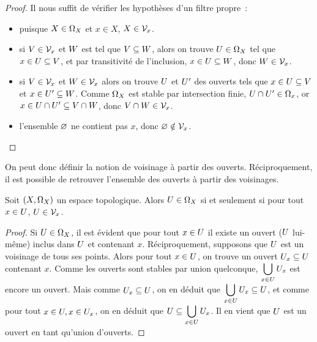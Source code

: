 \begin{proof}
  Il nous suffit de vérifier les hypothèses d'un filtre propre~:
  \begin{itemize}
  \item puisque $X\in\Omega_{X}$ et $x\in X$, $X\in \mathcal{V}_{x}$.
  \item si $V\in \mathcal{V}_{x}$ et $W$ est tel que
    $V\subseteq W$, alors on trouve
    $U\in \Omega_{X}$ tel que $x\in U \subseteq V$, et par
    transitivité de l'inclusion, $x\in U \subseteq W$, donc
    $W\in \mathcal{V}_{x}$.
  \item si $V\in \mathcal{V}_{x}$ et $W\in \mathcal{V}_{x}$ alors on trouve
    $U$ et $U'$ des
    ouverts tels que $x\in U \subseteq V$ et
    $x\in U' \subseteq W$. Comme
    $\Omega_{X}$ est stable par intersection finie,
    $U\cap U' \in\Omega_{x}$, or
    $x\in U\cap U' \subseteq V\cap W$,
    donc $V\cap W \in \mathcal{V}_{x}$.
  \item l'ensemble $\varnothing$ ne contient pas $x$, donc
    $\varnothing\notin\mathcal{V}_{x}$.\qedhere
  \end{itemize}
\end{proof}

On peut donc définir la notion de voisinage à partir des ouverts.
Réciproquement, il est possible de retrouver l'ensemble des ouverts à partir des
voisinages.

\begin{proposition}
  Soit $(X,\Omega_{X})$ un espace topologique. Alors $U\in \Omega_{X}$ si et
  seulement si pour tout $x\in U$, $U\in\mathcal{V}_{x}$.
\end{proposition}

\begin{proof}
  Si $U\in \Omega_{X}$, il est évident que pour tout $x\in U$ il
  existe un ouvert ($U$ lui-même) inclus dans $U$ et contenant $x$.
  Réciproquement, supposons que $U$ est un voisinage de tous ses points.
  Alors pour tout $x\in U$, on trouve un ouvert $U_x\subseteq U$
  contenant $x$. Comme les ouverts sont stables par union quelconque,
  $\displaystyle\bigcup_{x\in U} U_x$ est encore un ouvert.
  Mais comme $U_x\subseteq U$, on en déduit que
  $\displaystyle\bigcup_{x\in U} U_x \subseteq U$, et
  comme pour tout $x\in U, x\in U_x$, on en déduit que
  $U\subseteq\displaystyle\bigcup_{x\in U} U_x$.
  Il en vient que $U$ est un ouvert en tant qu'union d'ouverts.
\end{proof}

